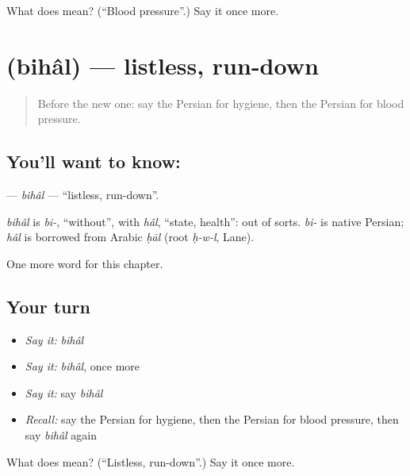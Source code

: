 \begin{tcolorbox}[breakable,colback=teal!4,colframe=teal!35!black,title={Before you move on}]
What does   mean? (\textquotedblleft{}Blood pressure\textquotedblright{}.) Say it once more.
\end{tcolorbox}
\section[\texorpdfstring{\fa{بیحال} (bihâl)}{بیحال (bihâl)}]{ (bihâl) — listless, run-down}

\label{lesson:FA-C190-bihal}



\begin{quote}
Before the new one: say the Persian for hygiene, then the Persian for blood pressure.
\end{quote}

\subsection*{You'll want to know: }
\textbf{} — \emph{bihâl} — \textquotedblleft{}listless, run-down\textquotedblright{}.

\begin{cousinweb}
\emph{bihâl} is \emph{bi-}, \textquotedblleft{}without\textquotedblright{}, with \emph{hâl}, \textquotedblleft{}state, health\textquotedblright{}: out of sorts. \emph{bi-} is native Persian; \emph{hâl} is borrowed from Arabic \emph{ḥāl} (root \emph{ḥ-w-l}, Lane).
\end{cousinweb}

\begin{grammarlens}[title={What you've built}]
One more word for this chapter.
\end{grammarlens}

\subsection*{Your turn}
\begin{itemize}
\raggedright
  \item \emph{Say it:} \emph{bihâl}
  \item \emph{Say it:} \emph{bihâl}, once more
  \item \emph{Say it:} say \emph{bihâl}
  \item \emph{Recall:} say the Persian for hygiene, then the Persian for blood pressure, then say \emph{bihâl} again
\end{itemize}

\begin{tcolorbox}[breakable,colback=teal!4,colframe=teal!35!black,title={Before you move on}]
What does  mean? (\textquotedblleft{}Listless, run-down\textquotedblright{}.) Say it once more.
\end{tcolorbox}
